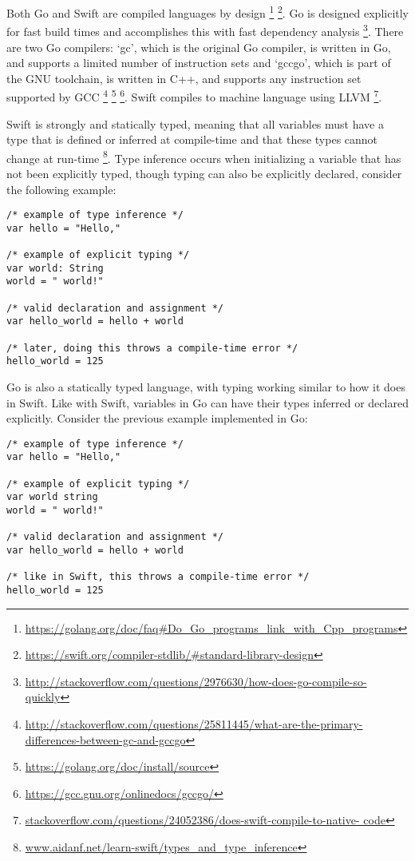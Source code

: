 \documentclass[letterpaper]{article}
\begin{document}
Both Go and Swift are compiled languages by design \footnote{\url{https://golang.org/doc/faq#Do_Go_programs_link_with_Cpp_programs}} \footnote{\url{https://swift.org/compiler-stdlib/#standard-library-design}}. Go is designed explicitly for fast build times and accomplishes this with fast dependency analysis \footnote{\url{http://stackoverflow.com/questions/2976630/how-does-go-compile-so-quickly}}. There are two Go compilers: `gc', which is the original Go compiler, is written in Go, and supports a limited number of instruction sets and `gccgo', which is part of the GNU toolchain, is written in C++, and supports any instruction set supported by GCC \footnote{\url{http://stackoverflow.com/questions/25811445/what-are-the-primary-differences-between-gc-and-gccgo}} \footnote{\url{https://golang.org/doc/install/source}} \footnote{\url{https://gcc.gnu.org/onlinedocs/gccgo/}}. Swift compiles to machine language using LLVM \footnote{\url{stackoverflow.com/questions/24052386/does-swift-compile-to-native-
code}}.

Swift is strongly and statically typed, meaning that all variables must have a type that is defined or inferred at compile-time and that these types cannot change at run-time \footnote{\url{www.aidanf.net/learn-swift/types_and_type_inference}}. Type inference occurs when initializing a variable that has not been explicitly typed, though typing can also be explicitly declared, consider the following example:

\begin{verbatim}
/* example of type inference */
var hello = "Hello,"

/* example of explicit typing */
var world: String
world = " world!"

/* valid declaration and assignment */
var hello_world = hello + world

/* later, doing this throws a compile-time error */
hello_world = 125
\end{verbatim}

Go is also a statically typed language, with typing working similar to how it does in Swift. Like with Swift, variables in Go can have their types inferred or declared explicitly. Consider the previous example implemented in Go:

\begin{verbatim}
/* example of type inference */ 
var hello = "Hello,"

/* example of explicit typing */
var world string
world = " world!"

/* valid declaration and assignment */
var hello_world = hello + world

/* like in Swift, this throws a compile-time error */
hello_world = 125
\end{verbatim}
\end{document}
